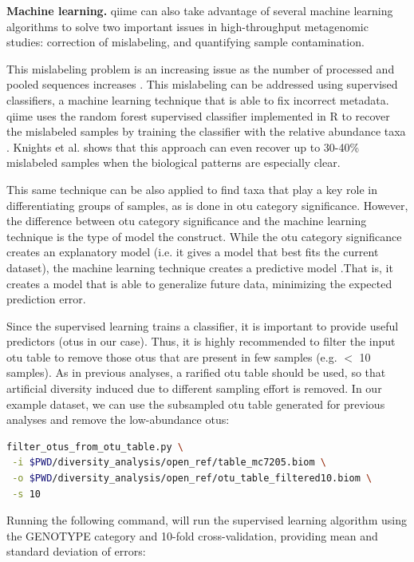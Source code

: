 \textbf{Machine learning.} \gls{qiime} can also take advantage of several machine learning algorithms to solve
two important issues in high-throughput metagenomic studies: correction of mislabeling, and quantifying
sample contamination.

This mislabeling problem is an increasing issue as the number of processed and pooled sequences
increases \cite{Knights2011Mislabel}. This mislabeling can be addressed using supervised classifiers,
a machine learning technique that is able to fix incorrect metadata. \gls{qiime} uses the random forest \cite{Breiman2001}
supervised classifier implemented in R \cite{Liaw2002} to recover the mislabeled samples by training the
classifier with the relative abundance taxa \cite{Knights2011SupClass}. Knights et al. \cite{Knights2011Mislabel}
shows that this approach can even recover up to 30-40\% mislabeled samples when the biological patterns are especially clear.

This same technique can be also applied to find taxa that play a key role in differentiating groups of samples, as
is done in \gls{otu} category significance. However, the difference between \gls{otu} category significance and the machine
learning technique is the type of model the construct. While the \gls{otu} category significance creates an explanatory
model (i.e. it gives a model that best fits the current dataset), the machine learning technique creates a predictive
model \cite{Knights2011SupClass}.That is, it creates a model that is able to generalize future data, minimizing the
expected prediction error.

Since the supervised learning trains a classifier, it is important to provide useful predictors (\gls{otu}s in our case).
Thus, it is highly recommended to filter the input \gls{otu} table to remove those \gls{otu}s that are present in few samples
(e.g. $<$ 10 samples). As in previous analyses, a rarified \gls{otu} table should be used, so that artificial diversity
induced due to different sampling effort is removed. In our example dataset, we can use the subsampled \gls{otu} table
generated for previous analyses and remove the low-abundance \gls{otu}s:

\begin{lstlisting}[language=bash]
filter_otus_from_otu_table.py \
 -i $PWD/diversity_analysis/open_ref/table_mc7205.biom \
 -o $PWD/diversity_analysis/open_ref/otu_table_filtered10.biom \
 -s 10
\end{lstlisting}

Running the following command, will run the supervised learning algorithm using the GENOTYPE
category and 10-fold cross-validation, providing mean and standard deviation of errors:

